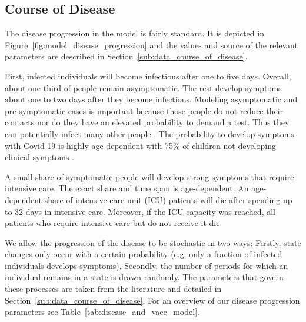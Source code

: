 \subsection{Course of Disease}
\label{sub:model_course_of_disease}

The disease progression in the model is fairly standard. It is depicted in
Figure~\ref{fig:model_disease_progression} and the values and source of the relevant
parameters are described in Section~\ref{sub:data_course_of_disease}.

First, infected individuals will become infectious after one to five days. Overall,
about one third of people remain asymptomatic. The rest develop symptoms about one to
two days after they become infectious. Modeling asymptomatic and pre-symptomatic cases
is important because those people do not reduce their contacts nor do they have an
elevated probability to demand a test. Thus they can potentially infect many other
people \citep{Donsimoni2020}. The probability to develop
symptoms with Covid-19 is highly age dependent with 75\% of children not developing
clinical symptoms \citep{Davies2020}.

A small share of symptomatic people will develop strong symptoms that require intensive
care. The exact share and time span is age-dependent. An age-dependent share of intensive
care unit (ICU) patients will die after spending up to 32 days in intensive care.
Moreover, if the ICU capacity was reached, all patients who require intensive care but do
not receive it die.


We allow the progression of the disease to be stochastic in two ways: Firstly, state
changes only occur with a certain probability (e.g. only a fraction of infected
individuals develops symptoms). Secondly, the number of periods for which an individual
remains in a state is drawn randomly. The parameters that govern these processes are
taken from the literature and detailed in Section~\ref{sub:data_course_of_disease}. For
an overview of our disease progression parameters see
Table~\ref{tab:disease_and_vacc_model}.

